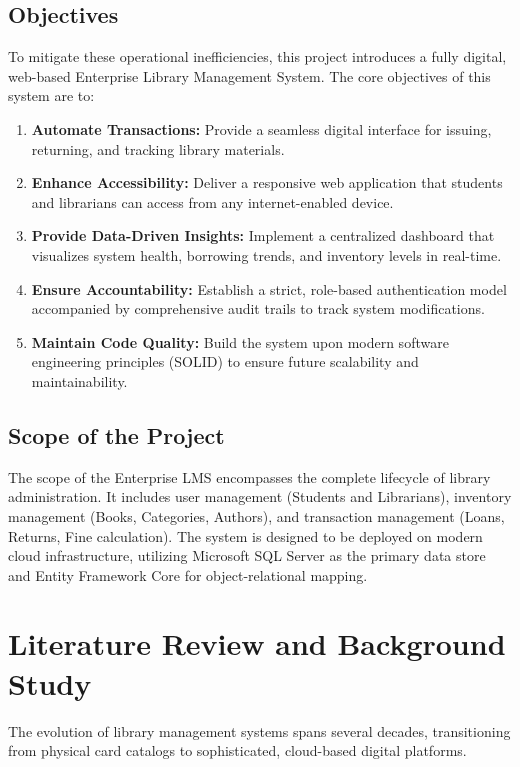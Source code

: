 \documentclass[conference]{IEEEtran}
\begin{document}
\subsection{Objectives}
To mitigate these operational inefficiencies, this project introduces a fully digital, web-based Enterprise Library Management System. The core objectives of this system are to:
\begin{enumerate}
    \item \textbf{Automate Transactions:} Provide a seamless digital interface for issuing, returning, and tracking library materials.
    \item \textbf{Enhance Accessibility:} Deliver a responsive web application that students and librarians can access from any internet-enabled device.
    \item \textbf{Provide Data-Driven Insights:} Implement a centralized dashboard that visualizes system health, borrowing trends, and inventory levels in real-time.
    \item \textbf{Ensure Accountability:} Establish a strict, role-based authentication model accompanied by comprehensive audit trails to track system modifications.
    \item \textbf{Maintain Code Quality:} Build the system upon modern software engineering principles (SOLID) to ensure future scalability and maintainability.
\end{enumerate}

\subsection{Scope of the Project}
The scope of the Enterprise LMS encompasses the complete lifecycle of library administration. It includes user management (Students and Librarians), inventory management (Books, Categories, Authors), and transaction management (Loans, Returns, Fine calculation). The system is designed to be deployed on modern cloud infrastructure, utilizing Microsoft SQL Server as the primary data store and Entity Framework Core for object-relational mapping.

\section{Literature Review and Background Study}
The evolution of library management systems spans several decades, transitioning from physical card catalogs to sophisticated, cloud-based digital platforms.
\end{document}
